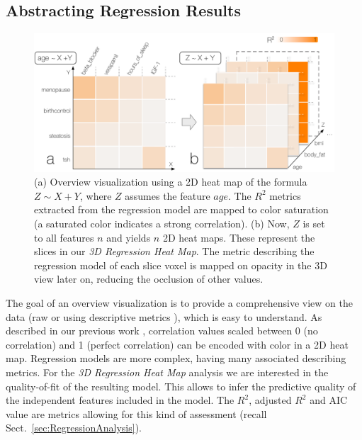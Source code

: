 \documentclass[journal]{style/vgtc} 			          %
\newcommand{\add}[1]{\textcolor{blue}{#1}}
\begin{document}
\subsection{Abstracting Regression Results}
\begin{figure}[htb]
 \centering
 \includegraphics[width=1.0\linewidth]{figures/heat_map}
 \caption{
 (a) Overview visualization using a 2D heat map of the formula $Z \sim X + Y$, where $Z$ assumes the feature $age$.
 The $R^2$ metrics extracted from the regression model are mapped to color saturation (a saturated color indicates a strong correlation).
 (b) Now, $Z$ is set to all features $n$ and yields $n$ 2D heat maps.
 These represent the slices in our \emph{3D Regression Heat Map}.
 The metric describing the regression model of each slice voxel is mapped on opacity in the 3D view later on, reducing the occlusion of other values.
 }
  \label{fig:Heat_Map}
\end{figure}
\noindent The goal of an overview visualization is to provide a comprehensive view on the data (raw or using descriptive metrics \cite{Bertini}), which is easy to understand.
As described in our previous work \cite{Klemm2014VIS}, correlation values scaled between 0 (no correlation) and 1 (perfect correlation) can be encoded with color in a 2D heat map.
Regression models are more complex, having many associated describing metrics.
For the \emph{3D Regression Heat Map} analysis we are interested in the quality-of-fit of the resulting model.
This allows to infer the predictive quality of the independent features included in the model.
The $R^2$, adjusted $R^2$ and AIC value are metrics allowing for this kind of assessment (recall Sect.~\ref{sec:RegressionAnalysis}).
\end{document}

